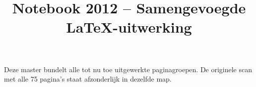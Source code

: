 \documentclass[a4paper]{article}
\title{Notebook 2012 -- Samengevoegde LaTeX-uitwerking}
\author{}
\date{}
\begin{document}
\maketitle
\thispagestyle{empty}

\begin{center}
Deze master bundelt alle tot nu toe uitgewerkte paginagroepen.
De originele scan met alle 75 pagina's staat afzonderlijk in dezelfde map.
\end{center}

\clearpage





















\end{document}
